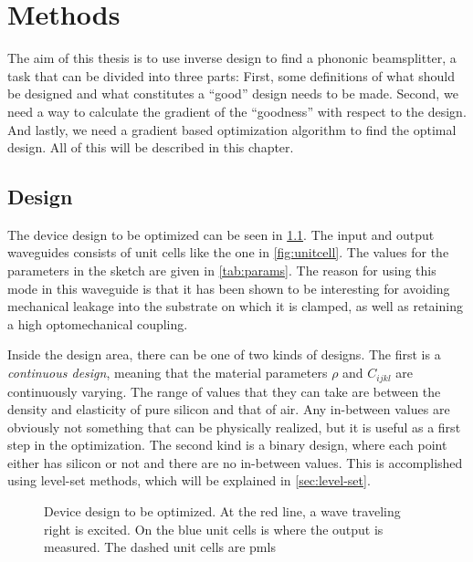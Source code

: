 \chapter{Methods}

The aim of this thesis is to use inverse design to find a phononic beamsplitter,
a task that can be divided into three parts: 
First, some definitions of what
should be designed and what constitutes a ``good'' design needs to be made.
Second, we need a way to calculate the gradient of the ``goodness'' with respect
to the design.
And lastly, we need a gradient based optimization algorithm to find the optimal
design.
All of this will be described in this chapter.

\section{Design}

The device design to be optimized can be seen in \cref{fig:bs-design}.
The input and output waveguides consists of unit cells like the one in
\cref{fig:unitcell}.
The values for the parameters in the sketch are given in \cref{tab:params}.
The reason for using this mode in this waveguide is that it has been shown to be
interesting for avoiding mechanical leakage into the substrate on which it is
clamped, as well as retaining a high optomechanical
coupling.\cite{kolvik_clamped_2023}

Inside the design area, there can be one of two kinds of designs.
The first is a \emph{continuous design}, meaning that the material parameters
$\rho$ and $C_{ijkl}$ are continuously varying. The range of values that they
can take are between the density and elasticity of pure silicon and that of air.
Any in-between values are obviously not something that can be physically
realized, but it is useful as a first step in the optimization.
The second kind is a binary design, where each point either has silicon or not
and there are no in-between values.
This is accomplished using level-set methods, which will be explained in
\cref{sec:level-set}.

\begin{figure}[htpb]
	\centering
	
	\caption{
		Device design to be optimized.
		At the red line, a wave traveling right is excited.
		On the blue unit cells is where the output is measured.
		The dashed unit cells are \glspl{pml}
	}
	\label{fig:bs-design}
\end{figure}

